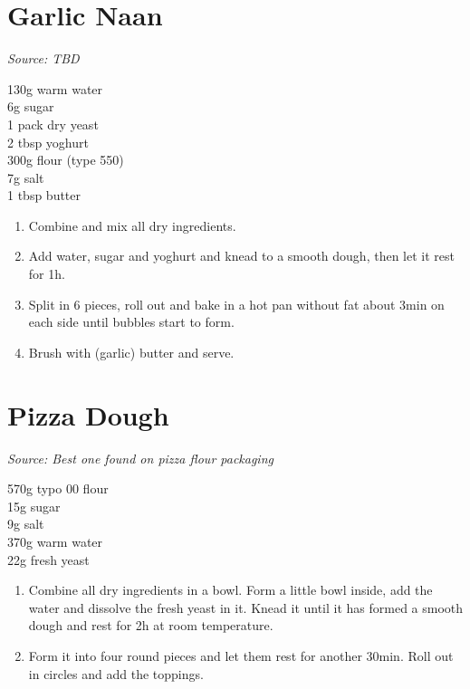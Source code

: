 \documentclass{report}
\begin{document}
\section{Garlic Naan}
\textit{Source: TBD}\\
\begin{minipage}[t]{0.21\textwidth} \vspace{0pt} 
130g warm water\\
6g sugar\\
1 pack dry yeast\\
2 tbsp yoghurt\\
300g flour (type 550)\\
7g salt\\
1 tbsp butter
\end{minipage}
\hfill
\begin{minipage}[t]{0.78\textwidth} \vspace{0pt}

	\begin{enumerate}
		\item Combine and mix all dry ingredients.
		\item Add water, sugar and yoghurt and knead to a smooth dough, then let it rest for 1h.
		\item Split in 6 pieces, roll out and bake in a hot pan without fat about 3min on each side until bubbles start to form.
		\item Brush with (garlic) butter and serve.
	\end{enumerate}	
\end{minipage}

\section{Pizza Dough}
\textit{Source: Best one found on pizza flour packaging}\\
\begin{minipage}[t]{0.21\textwidth} \vspace{0pt} 
570g typo 00 flour\\
15g sugar\\
9g salt\\
370g warm water\\
22g fresh yeast
\end{minipage}
\hfill
\begin{minipage}[t]{0.78\textwidth} \vspace{0pt}
	\begin{enumerate}
		\item Combine all dry ingredients in a bowl. Form a little bowl inside, add the water and dissolve the fresh yeast in it. Knead it until it has formed a smooth dough and rest for 2h at room temperature.
		\item Form it into four round pieces and let them rest for another 30min. Roll out in circles and add the toppings.
	\end{enumerate}	
\end{minipage}
\end{document}

